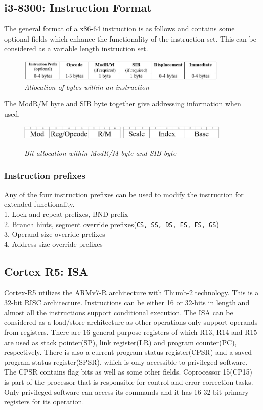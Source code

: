 \documentclass[a4paper,11pt]{article}
\begin{document}
\subsection{i3-8300: Instruction Format}
The general format of a x86-64 instruction is as follows and contains some optional fields which enhance the functionality of the instruction set. This can be considered as a variable length instruction set.
\begin{figure}[H]
\center
\includegraphics[width=0.90\textwidth]{figures/InsForm.jpg}
\caption{{\small \textit{Allocation of bytes within an instruction}}\cite{i3dev}}
\end{figure}
The ModR/M byte and SIB byte together give addressing information when used.
\begin{figure}[H]
\center
\includegraphics[width=0.45\textwidth]{figures/ModRM.jpg}
\includegraphics[width=0.45\textwidth]{figures/SIB.jpg}
\caption{{\small \textit{Bit allocation within ModR/M byte and SIB byte}}\cite{i3dev}}
\end{figure}
\subsubsection{Instruction prefixes\cite{x64asm}}
Any of the four instruction prefixes can be used to modify the instruction for extended functionality.\\
1.	Lock and repeat prefixes, BND prefix\\
2.	Branch hints, segment override prefixes({\tt CS, SS, DS, ES, FS, GS})\\
3.	Operand size override prefixes\\
4.	Address size override prefixes\\
\subsection{Cortex R5: ISA}
Cortex-R5 utilizes the ARMv7-R architecture with Thumb-2 technology. This is a 32-bit RISC architecture. Instructions can be either 16 or 32-bits in length and almost all the instructions support conditional execution. The ISA can be considered as a load/store architecture as other operations only support operands from registers. There are 16-general purpose registers of which R13, R14 and R15 are used as stack pointer(SP), link register(LR) and program counter(PC), respectively. There is also a current program status register(CPSR) and a saved program status register(SPSR), which is only accessible to privileged software. The CPSR contains flag bits as well as some other fields. Coprocessor 15(CP15) is part of the processor that is responsible for control and error correction tasks. Only privileged software can access its commands and it has 16 32-bit primary registers for its operation.
\end{document}
